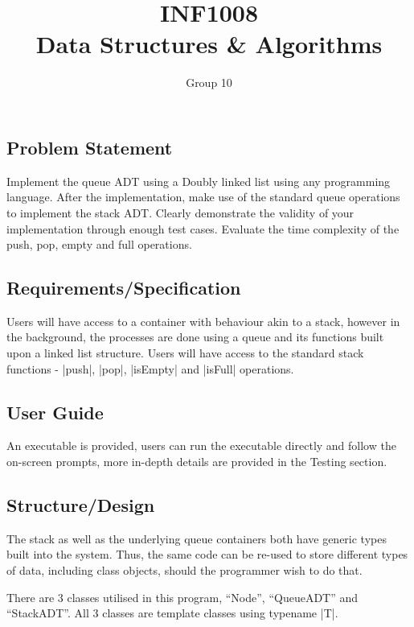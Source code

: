 \documentclass{report}
\title{\Huge{INF1008}\\Data Structures \& Algorithms}
\author{\huge{Group 10}}
\date{}
\begin{document}
\maketitle
\newpage%
\tableofcontents
\listoffigures
\pagebreak
\chapter{}
\section{Problem Statement}
Implement the queue ADT using a Doubly linked list using any programming language. After the implementation, make use of the standard queue operations to implement the stack ADT\@. Clearly demonstrate the validity of your implementation through enough test cases. Evaluate the time complexity of the push, pop, empty and full operations.
\section{Requirements/Specification}
Users will have access to a container with behaviour akin to a stack, however in the background, the processes are done using a queue and its functions built upon a linked list structure. Users will have access to the standard stack functions - |push|, |pop|, |isEmpty| and |isFull| operations.
\section{User Guide}
An executable is provided, users can run the executable directly and follow the on-screen prompts, more in-depth details are provided in the Testing section.
\section{Structure/Design}
The stack as well as the underlying queue containers both have generic types built into the system. Thus, the same code can be re-used to store different types of data, including class objects, should the programmer wish to do that.

There are 3 classes utilised in this program, ``Node'', ``QueueADT'' and ``StackADT''. All 3 classes are template classes using typename |T|.
\end{document}
